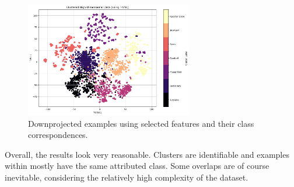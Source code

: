 \begin{figure}[htbp]
    \centering
    \includegraphics[width=0.5\linewidth, height=5cm]{figs/1_TSNE.png}
    \caption{Downprojected examples using selected features and their class correspondences.}
    \label{fig:1_TSNE}
\end{figure}

Overall, the results look very reasonable. Clusters are identifiable and examples within mostly have the same attributed class. Some overlaps are of course inevitable, considering the relatively high complexity of the dataset. 